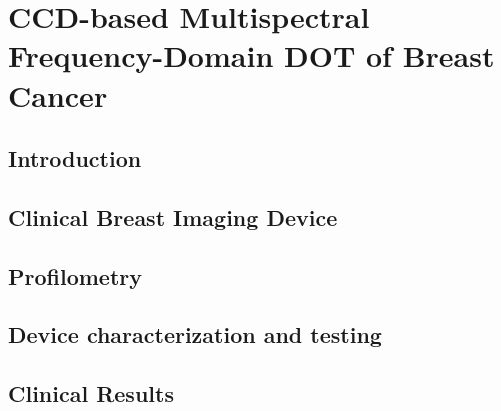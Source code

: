 \chapter{CCD-based Multispectral Frequency-Domain DOT of Breast Cancer}

\section{Introduction}

\section{Clinical Breast Imaging Device}

\section{Profilometry}

\section{Device characterization and testing}

\section{Clinical Results}